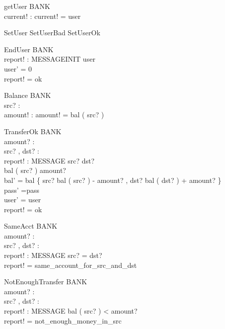 \begin{schema}{getUser}
\Xi BANK  \\ 
current! : \nat  
\where
current! = user
\end{schema}

\begin{zed}
SetUser \sdef  SetUserBad \lor   SetUserOk
\end{zed}


\begin{schema}{EndUser}
\Delta BANK \\ 
report! : MESSAGEINIT 
\where
user  \\
user' = 0 \\
report! = ok 
\end{schema}

\begin{schema}{Balance}
\Xi BANK \\ 
src? : \nat \\ 
amount! : \nat   
\where
amount! = bal ( src? ) 
\end{schema}



\begin{schema}{TransferOk}
\Delta BANK \\ 
amount? : \nat  \\ 
src? , dst? : \nat \\
report! : MESSAGE 
\where
src? \neq dst? \\
bal ( src? ) \geq amount?  \\
bal' = bal \oplus  \{ src? \map bal ( src? ) - amount? , dst? \map bal ( dst? ) + amount? \} \\
pass' =pass \\
user' = user \\
report! = ok 
\end{schema}


\begin{schema}{SameAcct}
\Xi BANK \\ 
amount? : \nat  \\ 
src? , dst? : \nat \\ 
report! : MESSAGE 
\where
src? = dst? \\
report! = same\_account\_for\_src\_and\_dst 
\end{schema}

\begin{schema}{NotEnoughTransfer}
\Xi BANK \\ 
amount? : \nat  \\ 
src? , dst? : \nat \\ 
report! : MESSAGE 
\where
bal ( src? ) < amount? \\
report! = not\_enough\_money\_in\_src 
\end{schema}



